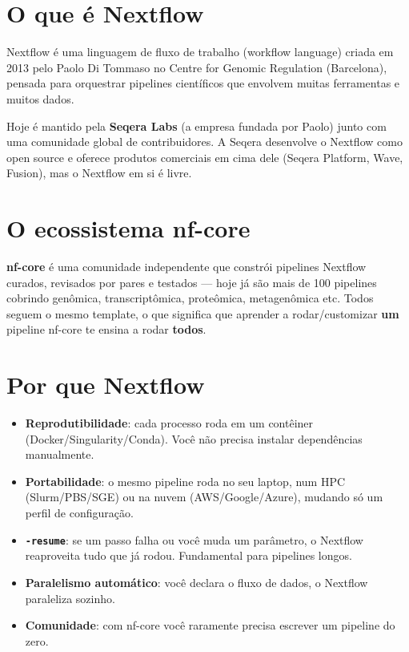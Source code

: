 \documentclass[
  brazilian,
  letterpaper,
  DIV=11,
  numbers=noendperiod]{scrreprt}
\providecommand{\tightlist}{%
  \setlength{\itemsep}{0pt}\setlength{\parskip}{0pt}}
\begin{document}
\section{O que é Nextflow}\label{o-que-uxe9-nextflow}

Nextflow é uma linguagem de fluxo de trabalho (workflow language) criada
em 2013 pelo Paolo Di Tommaso no Centre for Genomic Regulation
(Barcelona), pensada para orquestrar pipelines científicos que envolvem
muitas ferramentas e muitos dados.

Hoje é mantido pela \textbf{Seqera Labs} (a empresa fundada por Paolo)
junto com uma comunidade global de contribuidores. A Seqera desenvolve o
Nextflow como open source e oferece produtos comerciais em cima dele
(Seqera Platform, Wave, Fusion), mas o Nextflow em si é livre.

\section{O ecossistema nf-core}\label{o-ecossistema-nf-core}

\textbf{nf-core} é uma comunidade independente que constrói pipelines
Nextflow curados, revisados por pares e testados --- hoje já são mais de
100 pipelines cobrindo genômica, transcriptômica, proteômica,
metagenômica etc. Todos seguem o mesmo template, o que significa que
aprender a rodar/customizar \textbf{um} pipeline nf-core te ensina a
rodar \textbf{todos}.

\section{Por que Nextflow}\label{por-que-nextflow}

\begin{itemize}
\tightlist
\item
  \textbf{Reprodutibilidade}: cada processo roda em um contêiner
  (Docker/Singularity/Conda). Você não precisa instalar dependências
  manualmente.
\item
  \textbf{Portabilidade}: o mesmo pipeline roda no seu laptop, num HPC
  (Slurm/PBS/SGE) ou na nuvem (AWS/Google/Azure), mudando só um perfil
  de configuração.
\item
  \textbf{\texttt{-resume}}: se um passo falha ou você muda um
  parâmetro, o Nextflow reaproveita tudo que já rodou. Fundamental para
  pipelines longos.
\item
  \textbf{Paralelismo automático}: você declara o fluxo de dados, o
  Nextflow paraleliza sozinho.
\item
  \textbf{Comunidade}: com nf-core você raramente precisa escrever um
  pipeline do zero.
\end{itemize}
\end{document}
